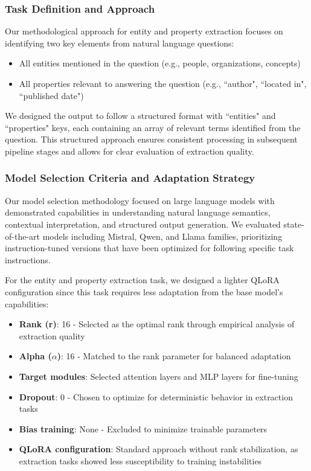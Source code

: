\subsubsection{Task Definition and Approach}
Our methodological approach for entity and property extraction focuses on identifying two key elements from natural language questions:
\begin{itemize}
    \item All entities mentioned in the question (e.g., people, organizations, concepts)
    \item All properties relevant to answering the question (e.g., ``author", ``located in", ``published date")
\end{itemize}

We designed the output to follow a structured format with ``entities" and ``properties" keys, each containing an array of relevant terms identified from the question. This structured approach ensures consistent processing in subsequent pipeline stages and allows for clear evaluation of extraction quality.

\subsubsection{Model Selection Criteria and Adaptation Strategy}
Our model selection methodology focused on large language models with demonstrated capabilities in understanding natural language semantics, contextual interpretation, and structured output generation. We evaluated state-of-the-art models including Mistral, Qwen, and Llama families, prioritizing instruction-tuned versions that have been optimized for following specific task instructions.

For the entity and property extraction task, we designed a lighter QLoRA configuration since this task requires less adaptation from the base model's capabilities:

\begin{itemize}
    \item \textbf{Rank (r)}: 16 - Selected as the optimal rank through empirical analysis of extraction quality
    \item \textbf{Alpha ($\alpha$)}: 16 - Matched to the rank parameter for balanced adaptation
    \item \textbf{Target modules}: Selected attention layers and MLP layers for fine-tuning
    \item \textbf{Dropout}: 0 - Chosen to optimize for deterministic behavior in extraction tasks
    \item \textbf{Bias training}: None - Excluded to minimize trainable parameters
    \item \textbf{QLoRA configuration}: Standard approach without rank stabilization, as extraction tasks showed less susceptibility to training instabilities
\end{itemize}

